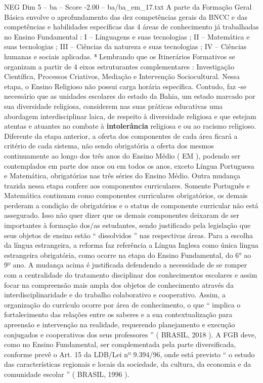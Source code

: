 \begin{textsample}{NEG Dim 5 – ba – Score -2.00 – ba/ba\_em\_17.txt}
A parte da Formação Geral Básica envolve o aprofundamento das dez competências gerais da BNCC e das competências e habilidades específicas das 4 áreas de conhecimento já trabalhadas no Ensino Fundamental : I – Linguagens e suas tecnologias ; II – Matemática e suas tecnologias ; III – Ciências da natureza e suas tecnologias ; IV – Ciências humanas e sociais aplicadas. ⁸ Lembrando que os Itinerários Formativos se organizam a partir de 4 eixos estruturantes complementares : Investigação Científica, Processos Criativos, Mediação e Intervenção Sociocultural.
Nessa etapa, o Ensino Religioso não possui carga horária específica.
Contudo, faz -se necessário que as unidades escolares do estado da Bahia, um estado marcado por sua diversidade religiosa, considerem nas suas práticas educativas uma abordagem interdisciplinar laica, de respeito à diversidade religiosa e que estejam atentas e atuantes no combate à \textbf{intolerância} religiosa e ou ao racismo religioso.
Diferente da etapa anterior, a oferta dos componentes de cada área ficará a critério de cada sistema, não sendo obrigatória a oferta dos mesmos continuamente ao longo dos três anos do Ensino Médio ( EM ), podendo ser contemplados em parte dos anos ou em todos os anos, exceto Língua Portuguesa e Matemática, obrigatórias nas três séries do Ensino Médio.
Outra mudança trazida nessa etapa confere aos componentes curriculares.
Somente Português e Matemática continuam como componentes curriculares obrigatórios, os demais perderam a condição de obrigatórios e o status de componente curricular não está assegurado.
Isso não quer dizer que os demais componentes deixaram de ser importantes à formação dos/as estudantes, sendo justificado pela legislação que seus objetos de ensino estão “ dissolvidos ” nas respectivas áreas.
Para a escolha da língua estrangeira, a reforma faz referência a Língua Inglesa como única língua estrangeira obrigatória, como ocorre na etapa do Ensino Fundamental, do 6{\EmojiFont °} ao 9º ano.
A mudança acima é justificada defendendo a necessidade de se romper com a centralidade do tratamento disciplinar dos conhecimentos escolares e assim focar na compreensão mais ampla dos objetos de conhecimento através da interdisciplinaridade e do trabalho colaborativo e cooperativo.
Assim, a organização do currículo ocorre por área de conhecimento, o que “ implica o fortalecimento das relações entre os saberes e a sua contextualização para apreensão e intervenção na realidade, requerendo planejamento e execução conjugados e cooperativos dos seus professores ” ( BRASIL, 2018 ).
A FGB deve, como no Ensino Fundamental, ser complementada pela parte diversificada, conforme prevê o Art. 15 da LDB/Lei nº 9.394/96, onde está previsto “ o estudo das características regionais e locais da sociedade, da cultura, da economia e da comunidade escolar ” ( BRASIL, 1996 ).

\end{textsample}
